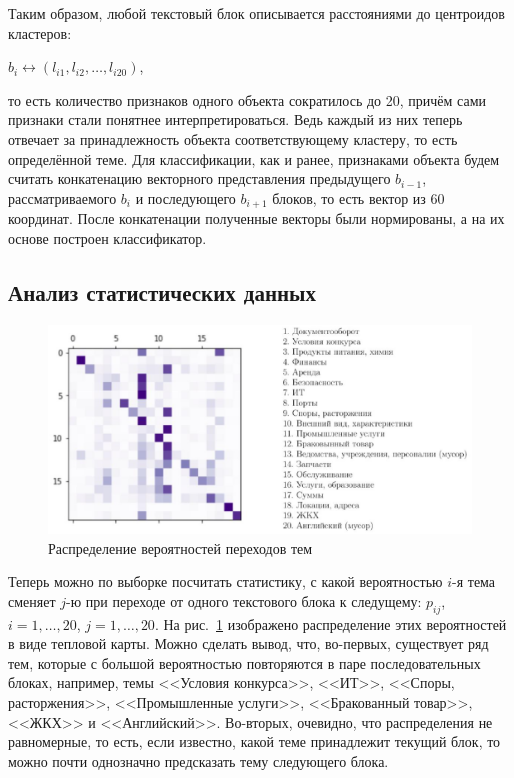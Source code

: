 \documentclass[12pt]{article}
\begin{document}
Таким образом, любой текстовый блок описывается расстояниями до центроидов кластеров:

\begin{center}
	$b_i \leftrightarrow (l_{i1}, l_{i2},\ldots, l_{i20})$,
\end{center}

\noindent то есть количество признаков одного объекта сократилось до 20, причём сами признаки стали понятнее интерпретироваться. Ведь каждый из них теперь отвечает за принадлежность объекта соответствующему кластеру, то есть определённой теме. Для классификации, как и ранее, признаками объекта будем считать конкатенацию векторного представления предыдущего $b_{i-1}$, рассматриваемого $b_i$ и последующего $b_{i+1}$ блоков, то есть вектор из 60 координат. После конкатенации полученные векторы были нормированы, а на их основе построен классификатор.

\subsection{Анализ статистических данных}
\begin{figure}[h!]
	\includegraphics[scale=0.85]{images/im5.eps}
	\caption{Распределение вероятностей переходов тем}
	\label{im5}
\end{figure}
Теперь можно по выборке посчитать статистику, с какой вероятностью $i$-я тема сменяет $j$-ю при переходе от одного текстового блока к следущему: $p_{ij}$, $i = 1,\ldots, 20$, $j = 1,\ldots, 20$. На рис.~\ref{im5} изображено распределение этих вероятностей в виде тепловой карты. Можно сделать вывод, что, во-первых, существует ряд тем, которые с большой вероятностью повторяются в паре последовательных блоках, например, темы <<Условия конкурса>>, <<ИТ>>, <<Споры, расторжения>>, <<Промышленные услуги>>, <<Бракованный товар>>, <<ЖКХ>> и <<Английский>>. Во-вторых, очевидно, что распределения не равномерные, то есть, если известно, какой теме принадлежит текущий блок, то можно почти однозначно предсказать тему следующего блока. 
\end{document}
